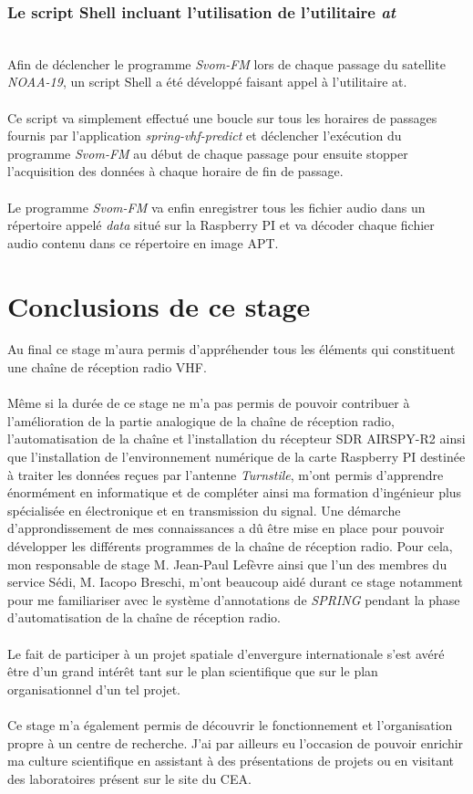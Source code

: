\documentclass[12pt,fleqn]{book} %
\begin{document}
\section{Le script Shell incluant l'utilisation de l'utilitaire \emph{at}}
~\\\indent Afin de déclencher le programme \emph{Svom-FM} lors de chaque passage du satellite \emph{NOAA-19}, un script Shell a été développé faisant appel à l'utilitaire at.
~\\\\Ce script va simplement effectué une boucle sur tous les horaires de passages fournis par l'application \emph{spring-vhf-predict} et déclencher l'exécution du programme \emph{Svom-FM} au début de chaque passage pour ensuite stopper l'acquisition des données à chaque horaire de fin de passage.
~\\\\Le programme \emph{Svom-FM} va enfin enregistrer tous les fichier audio dans un répertoire appelé \emph{data} situé sur la Raspberry PI et va décoder chaque fichier audio contenu dans ce répertoire en image APT.
\part{Conclusions de ce stage}
Au final ce stage m'aura permis d'appréhender tous les éléments qui constituent une chaîne de réception radio VHF.
~\\\\Même si la durée de ce stage ne m'a pas permis de pouvoir contribuer à l'amélioration de la partie analogique de la chaîne de réception radio, l'automatisation de la chaîne et l'installation du récepteur SDR AIRSPY-R2 ainsi que l'installation de l'environnement numérique de la carte Raspberry PI destinée à traiter les données reçues par l'antenne \emph{Turnstile}, m'ont permis d'apprendre énormément en informatique et de compléter ainsi ma formation d'ingénieur plus spécialisée en électronique et en transmission du signal.
Une démarche d'approndissement de mes connaissances a dû être mise en place pour pouvoir développer les différents programmes de la chaîne de réception radio. Pour cela, mon responsable de stage M. Jean-Paul Lefèvre ainsi que l'un des membres du service Sédi, M. Iacopo Breschi, m'ont beaucoup aidé durant ce stage notamment pour me familiariser avec le système d'annotations de \emph{SPRING} pendant la phase d'automatisation de la chaîne de réception radio.
~\\\\Le fait de participer à un projet spatiale d'envergure internationale s'est avéré être d'un grand intérêt tant sur le plan scientifique que sur le plan organisationnel d'un tel projet.
~\\\\Ce stage m'a également permis de découvrir le fonctionnement et l'organisation propre à un centre de recherche. J'ai par ailleurs eu l'occasion de pouvoir enrichir ma culture scientifique en assistant à des présentations de projets ou en visitant des laboratoires présent sur le site du CEA.
\end{document}

